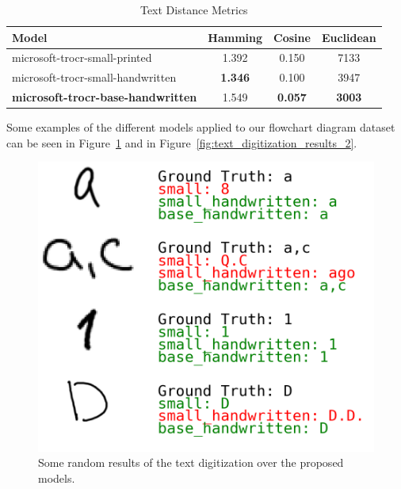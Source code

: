 \documentclass[conference]{IEEEtran}
\begin{document}
\begin{table}[htbp]
\caption{Text Distance Metrics}
\centering
\begin{tabular}{lccc}
\hline
\textbf{Model} & \textbf{Hamming} & \textbf{Cosine} & \textbf{Euclidean} \\
\hline
microsoft-trocr-small-printed & 1.392 & 0.150 & 7133 \\
microsoft-trocr-small-handwritten & \textbf{1.346} & 0.100  & 3947 \\ 
\hline 
\textbf{microsoft-trocr-base-handwritten} & 1.549 & \textbf{0.057} & \textbf{3003} \\
\hline
\end{tabular}
\label{tab:text_digitization}
\end{table}

Some examples of the different models applied to our flowchart diagram dataset can be seen in Figure~\ref{fig:text_digitization_results_1} and in Figure~\ref{fig:text_digitization_results_2}. \\

\begin{figure}[H]
\centering
\includegraphics[width=\linewidth]{text_digitization_results_1.png}
\caption{Some random results of the text digitization over the proposed models.}
\label{fig:text_digitization_results_1}
\end{figure}
\end{document}
